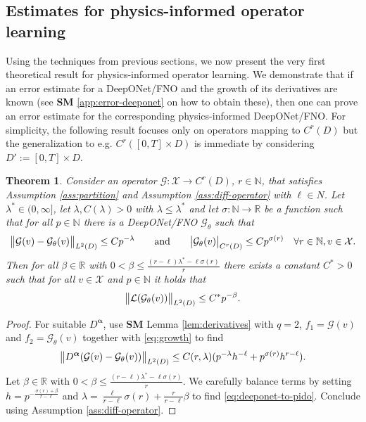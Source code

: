 \documentclass{article}
\numberwithin{equation}{section}
\newcommand{\R}{\mathbb{R}}
\newcommand{\N}{\mathbb{N}}
\newcommand{\cG}{\mathcal{G}}
\newcommand{\cL}{\mathcal{L}}
\newcommand{\cX}{\mathcal{X}}
\newcommand{\bmalpha}{{\bm{\alpha}}}
\newcommand{\1}{\mathbbm{1}}
\newtheorem{theorem}{Theorem}[section]
\begin{document}
\subsection{Estimates for physics-informed operator learning} \label{sec:FD}

Using the techniques from previous sections, we now present the very first theoretical result for physics-informed operator learning. We demonstrate that if an error estimate for a DeepONet/FNO and the growth of its derivatives are known (see \textbf{SM} \ref{app:error-deeponet} on how to obtain these), then one can prove an error estimate for the corresponding physics-informed DeepONet/FNO. For simplicity, the following result focuses only on operators mapping to $C^r(D)$ but the generalization to e.g. $C^r([0,T]\times D)$ is immediate by considering $D' := [0,T]\times D$.

\begin{theorem}\label{thm:deeponet-to-pido}
Consider an operator $\cG:\cX\to C^r(D)$, $r\in\N$, that satisfies Assumption \ref{ass:partition} and Assumption \ref{ass:diff-operator} with $\ell\in N$. Let $\lambda^*\in (0,\infty]$, let $\lambda, C(\lambda)>0$ with $\lambda\leq\lambda^*$ and let $\sigma:\N\to\R$ be a function such that for all $p\in \N$ there is a DeepONet/FNO $\cG_\theta$ such that
\begin{equation}\label{eq:growth}
    \norm{\cG(v)-\cG_\theta(v)}_{L^2(D)}\leq Cp^{-\lambda}\qquad \text{and} \qquad \abs{\cG_\theta(v)}_{C^r(D)}\leq Cp^{\sigma(r)}\quad \forall r\in\N, v\in\cX. 
\end{equation}
Then for all $\beta\in\R$ with $0<\beta\leq \frac{(r-\ell)\lambda^*-\ell\sigma(r)}{r}$ there exists a constant $C^*>0$ such that for all $v\in \cX$ and $p\in\N$
it holds that
\begin{equation}\label{eq:deeponet-to-pido}
    \norm{\cL(\cG_\theta(v))}_{L^2(D)} \leq C^*p^{-\beta}.
\end{equation}
\end{theorem}
\begin{proof}
For suitable $D^\bmalpha$, use {\bf SM} Lemma \ref{lem:derivatives} with $q=2$, $f_1=\cG(v)$ and $f_2=\cG_\theta(v)$ together with \eqref{eq:growth} to find
\begin{equation}
    \norm{D^\bmalpha(\cG(v)-\cG_\theta(v))}_{L^2(D)} \leq C(r,\lambda)(p^{-\lambda}h^{-\ell} + p^{\sigma(r)}h^{r-\ell}). 
\end{equation}
Let $\beta\in\R$ with $0<\beta\leq \frac{(r-\ell)\lambda^*-\ell\sigma(r)}{r}$. We carefully balance terms by setting $h=p^{-\frac{\sigma(r)+\beta}{r-\ell}}$ and $\lambda = \frac{\ell}{r-\ell}\sigma(r)+\frac{r}{r-\ell}\beta$ to find \eqref{eq:deeponet-to-pido}. Conclude using Assumption \ref{ass:diff-operator}.
\end{proof}
\end{document}
